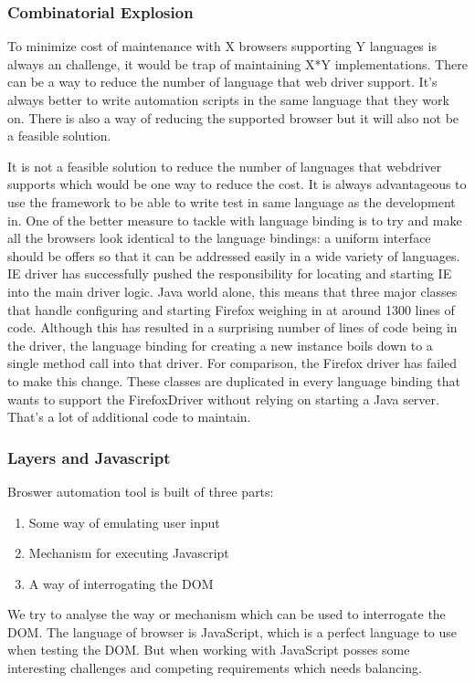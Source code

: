 \documentclass[article,type=msc,colorback,accentcolor=tud9c,twoside,11pt]{tudthesis}
\begin{document}
	\subsubsection{Combinatorial Explosion}
	To minimize cost of maintenance with X browsers supporting Y languages is always an challenge, it would be trap of maintaining X*Y implementations. There can be a way to reduce the number of language that web driver support. It's always better to write automation scripts in the same language that they work on. There is also a way of reducing the supported browser but it will also not be a feasible solution.
	
	It is not a feasible solution to reduce the number of languages that webdriver supports which would be one way to reduce the cost. It is always advantageous to use the framework to be able to write test in same language as the development in. One of the better measure to tackle with language binding is to try and make all the browsers look identical to the language bindings: a uniform interface should be offers so that it can be addressed easily in a wide variety of languages. IE driver has successfully pushed the responsibility for locating and starting IE into the main driver logic. Java world alone, this means that three major classes that handle configuring and starting Firefox weighing in at around 1300 lines of code. Although this has resulted in a surprising number of lines of code being in the driver, the language binding for creating a new instance boils down to a single method call into that driver. For comparison, the Firefox driver has failed to make this change. These classes are duplicated in every language binding that wants to support the FirefoxDriver without relying on starting a Java server. That's a lot of additional code to maintain.
	
	\subsubsection{Layers and Javascript}
	Broswer automation tool is built of three parts:
	\begin{enumerate}
		\item Some way of emulating user input
		\item Mechanism for executing Javascript
		\item A way of interrogating the DOM
	\end{enumerate}
	We try to analyse the way or mechanism which can be used to interrogate the DOM. The language of browser is JavaScript, which is a perfect language to use when testing the DOM. But when working with JavaScript posses some interesting challenges and competing requirements which needs balancing.
	
\end{document}

